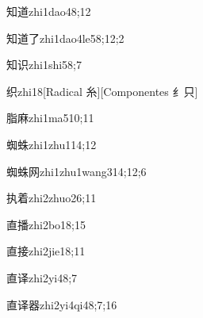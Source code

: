 \begin{verbete}{知道}{zhi1dao4}{8;12}
\end{verbete}

\begin{verbete}{知道了}{zhi1dao4le5}{8;12;2}
\end{verbete}

\begin{verbete}{知识}{zhi1shi5}{8;7}
\end{verbete}

\begin{verbete}{织}{zhi1}{8}[Radical 糸][Componentes 纟只]
\end{verbete}

\begin{verbete}{脂麻}{zhi1ma5}{10;11}
\end{verbete}

\begin{verbete}{蜘蛛}{zhi1zhu1}{14;12}
\end{verbete}

\begin{verbete}{蜘蛛网}{zhi1zhu1wang3}{14;12;6}
\end{verbete}

\begin{verbete}{执着}{zhi2zhuo2}{6;11}
\end{verbete}

\begin{verbete}{直播}{zhi2bo1}{8;15}
\end{verbete}

\begin{verbete}{直接}{zhi2jie1}{8;11}
\end{verbete}

\begin{verbete}{直译}{zhi2yi4}{8;7}
\end{verbete}

\begin{verbete}{直译器}{zhi2yi4qi4}{8;7;16}
\end{verbete}

